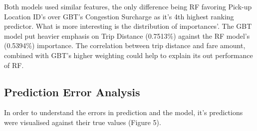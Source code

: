 \documentclass[11pt]{article}
\begin{document}
\begin{table}[H]
\caption{Top 4 highest scoring features (importance) for the Gradient Boosted and Random Forest Models.}
\label{tab:feature_importances}
\end{table}
Both models used similar features, the only difference being RF favoring Pick-up Location ID's over GBT's Congestion Surcharge as it's 4th highest ranking predictor.
What is more interesting is the distribution of importances'. The GBT model put heavier emphasis on Trip Distance (0.7513\%) against the RF model's (0.5394\%) importance. The correlation between trip distance and fare amount, combined with GBT's higher weighting could help to explain its out performance of RF. 


\subsection{Prediction Error Analysis}

In order to understand the errors in prediction and the model, it's predictions were visualised against their true values (Figure 5).
\end{document}

